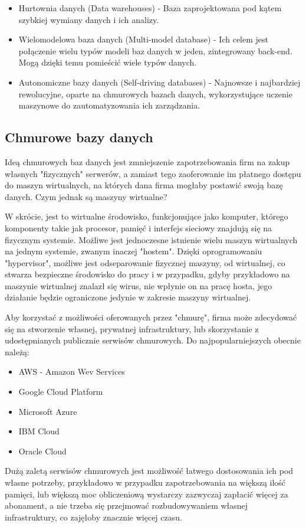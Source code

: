 \documentclass[12pt, a4paper]{article}
\begin{document}
\begin{sloppypar}
{{\begin{itemize}
      bazy danych, projektowane z myślą o dużej ilości transakcji wykonywanych pomiędzy
      wieloma użytkownikami. 
      \item Hurtownia danych (Data warehouses) - Baza zaprojektowana pod kątem
      szybkiej wymiany danych i ich analizy.
      \item Wielomodelowa baza danych (Multi-model database) - Ich celem jest połączenie
      wielu typów modeli baz danych w jeden, zintegrowany back-end. Mogą dzięki temu
      pomieścić wiele typów danych.
      \item Autonomiczne bazy danych (Self-driving databases) - Najnowsze i najbardziej
      rewolucyjne, oparte na chmurowych bazach danych, wykorzystujące uczenie
      maszynowe do zautomatyzowania ich zarządzania.
    \end{itemize}
  }
  \subsection{Chmurowe bazy danych}
  {
    Ideą chmurowych baz danych jest zmniejszenie zapotrzebowania firm na zakup własnych
    "fizycznych" serwerów, a zamiast tego zaoferowanie im płatnego dostępu do maszyn
    wirtualnych, na których dana firma mogłaby postawić swoją bazę danych. Czym jednak
    są maszyny wirtualne? 
    
    W skrócie, jest to wirtualne środowisko, funkcjonujące jako
    komputer, którego komponenty takie jak procesor, pamięć i interfejs sieciowy
    znajdują się na fizycznym systemie. Możliwe jest jednoczesne istnienie wielu maszyn
    wirtualnych na jednym systemie, zwanym inaczej "hostem". Dzięki oprogramowaniu
    "hypervisor", możliwe jest odseparowanie fizycznej maszyny, od wirtualnej,
    co stwarza bezpieczne środowisko do pracy i w przypadku, gdyby przykładowo na
    maszynie wirtualnej znalazł się wirus, nie wpłynie on na pracę hosta, jego
    działanie będzie ograniczone jedynie w zakresie maszyny wirtualnej.

    Aby korzystać z możliwości oferowanych przez "chmurę", firma może zdecydować się
    na stworzenie własnej, prywatnej infrastruktury, lub skorzystanie z udostępnianych
    publicznie serwisów chmurowych. Do najpopularniejszych obecnie należą:
    \begin{itemize}
      \item AWS - Amazon Wev Services
      \item Google Cloud Platform
      \item Microsoft Azure
      \item IBM Cloud
      \item Oracle Cloud
    \end{itemize}
    Dużą zaletą serwisów chmurowych jest możliwość łatwego dostosowania ich pod własne
    potrzeby, przykładowo w przypadku zapotrzebowania na większą ilość pamięci, lub
    większą moc obliczeniową wystarczy zazwyczaj zapłacić więcej za abonament, a nie
    trzeba się przejmować rozbudowywaniem własnej infrastruktury, co zajęłoby znacznie
    więcej czasu.
  }
}
\end{sloppypar}
\end{document}
